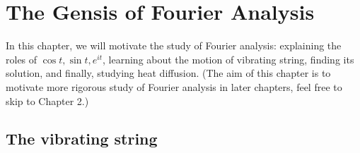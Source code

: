 \chapter{The Gensis of Fourier Analysis}

In this chapter, we will motivate the study of Fourier analysis: explaining the roles of $\cos t, \sin t, e^{it}$, learning about the motion of vibrating string, finding its solution, and finally, studying heat diffusion. (The aim of this chapter is to motivate more rigorous study of Fourier analysis in later chapters, feel free to skip to Chapter 2.)

\section{The vibrating string}



